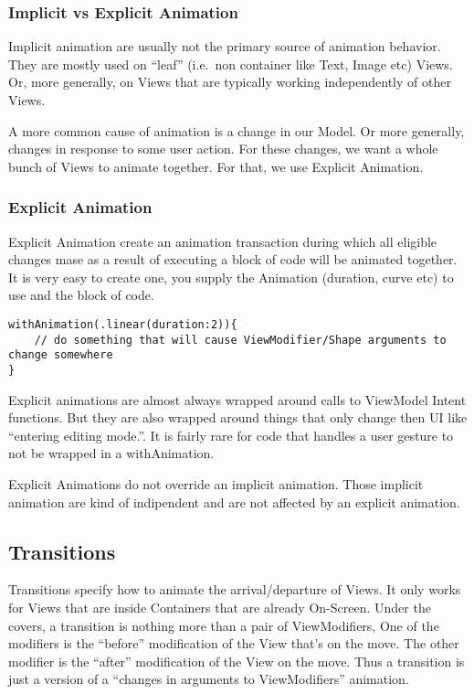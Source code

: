 \documentclass[]{article}
\begin{document}
\hypertarget{implicit-vs-explicit-animation}{%
\subsubsection{Implicit vs Explicit
Animation}\label{implicit-vs-explicit-animation}}

Implicit animation are usually not the primary source of animation
behavior. They are mostly used on ``leaf'' (i.e.~non container like
Text, Image etc) Views. Or, more generally, on Views that are typically
working independently of other Views.

A more common cause of animation is a change in our Model. Or more
generally, changes in response to some user action. For these changes,
we want a whole bunch of Views to animate together. For that, we use
Explicit Animation.

\hypertarget{explicit-animation}{%
\subsubsection{Explicit Animation}\label{explicit-animation}}

Explicit Animation create an animation transaction during which all
eligible changes mase as a result of executing a block of code will be
animated together. It is very easy to create one, you supply the
Animation (duration, curve etc) to use and the block of code.

\begin{verbatim}
withAnimation(.linear(duration:2)){
    // do something that will cause ViewModifier/Shape arguments to change somewhere
}
\end{verbatim}

Explicit animations are almost always wrapped around calls to ViewModel
Intent functions. But they are also wrapped around things that only
change then UI like ``entering editing mode.''. It is fairly rare for
code that handles a user gesture to not be wrapped in a withAnimation.

Explicit Animations do not override an implicit animation. Those
implicit animation are kind of indipendent and are not affected by an
explicit animation.

\hypertarget{transitions}{%
\subsection{Transitions}\label{transitions}}

Transitions specify how to animate the arrival/departure of Views. It
only works for Views that are inside Containers that are already
On-Screen. Under the covers, a transition is nothing more than a pair of
ViewModifiers, One of the modifiers is the ``before'' modification of
the View that's on the move. The other modifier is the ``after''
modification of the View on the move. Thus a transition is just a
version of a ``changes in arguments to ViewModifiers'' animation.
\end{document}
